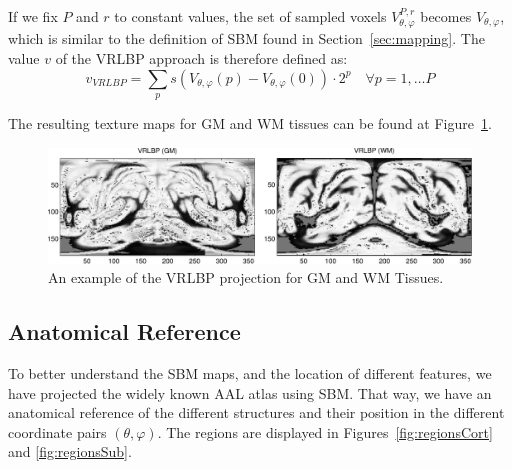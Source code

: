 If we fix $P$ and $r$ to constant values, the set of sampled voxels $V_{\theta,\varphi}^{P,r}$ becomes $V_{\theta,\varphi}$, which is similar to the definition of \ac{SBM} found in Section~\ref{sec:mapping}. The value $v$ of the \ac{VRLBP} approach is therefore defined as: 
\begin{equation}
v_{VRLBP} = \sum_{p} s(V_{\theta,\varphi}(p)-V_{\theta,\varphi}(0))\cdot 2^{p} \quad \forall p=1,\dots P
\end{equation}

The resulting texture maps for \ac{GM} and \ac{WM} tissues can be found at Figure~\ref{fig:vrlbp}. 

\begin{figure}[htp]
	\centering
	\includegraphics[width=\textwidth]{Graphics/ch6/04-vrlbp}
	\caption{An example of the \acs{VRLBP} projection for \acs{GM} and \acs{WM} Tissues. }
	\label{fig:vrlbp}
\end{figure}

%	
%	

\subsection{Anatomical Reference}\label{sec:anatomical}
To better understand the \ac{SBM} maps, and the location of different features, we have projected the widely known \ac{AAL} atlas \cite{Tzourio-Mazoyer2002} using \ac{SBM}. That way, we have an anatomical reference of the different structures and their position in the different coordinate pairs $(\theta,\varphi)$. The regions are displayed in  Figures~\ref{fig:regionsCort} and \ref{fig:regionsSub}. 

